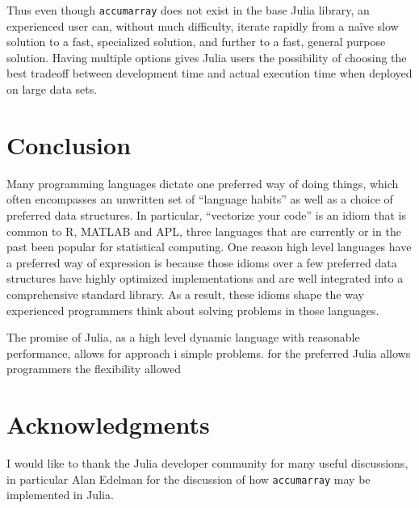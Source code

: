 \documentclass[11pt]{asaproc}
\begin{document}
Thus even though \lstinline|accumarray| does not exist in the base Julia
library, an experienced user can, without much difficulty, iterate rapidly from
a na\"ive slow solution to a fast, specialized solution, and further to a fast,
general purpose solution. Having multiple options gives Julia users the
possibility of choosing the best tradeoff between development time and actual
execution time when deployed on large data sets.



\section{Conclusion}

Many programming languages dictate one preferred way of doing things, which
often encompasses an unwritten set of ``language habits'' as well as a choice
of preferred data structures. In particular, ``vectorize your code'' is an
idiom that is common to R, MATLAB and APL, three languages that are currently
or in the past been popular for statistical computing. One reason high level
languages have a preferred way of expression is because those idioms over a few
preferred data structures have highly optimized implementations and are well
integrated into a comprehensive standard library. As a result, these idioms
shape the way experienced programmers think about solving problems in those
languages.

The promise of Julia, as a high level dynamic language with reasonable
performance, allows for  approach i  simple problems.  for the preferred  Julia
allows programmers the
flexibility allowed

\section*{Acknowledgments}

I would like to thank the Julia developer community for many useful
discussions, in particular Alan Edelman for the discussion of how
\lstinline|accumarray| may be implemented in Julia.


\end{document}
